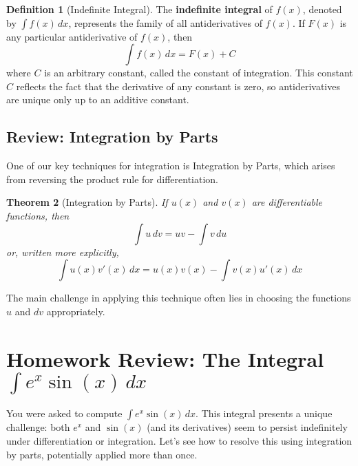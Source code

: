 \documentclass[11pt]{article}
\newtheorem{theorem}{Theorem}[section]
\theoremstyle{definition}
\newtheorem{definition}[theorem]{Definition}
\theoremstyle{remark}
\begin{document}
\begin{definition}[Indefinite Integral]
The \textbf{indefinite integral} of $f(x)$, denoted by $\int f(x) \, dx$, represents the family of all antiderivatives of $f(x)$. If $F(x)$ is any particular antiderivative of $f(x)$, then
\[ \int f(x) \, dx = F(x) + C \]
where $C$ is an arbitrary constant, called the constant of integration. This constant $C$ reflects the fact that the derivative of any constant is zero, so antiderivatives are unique only up to an additive constant.
\end{definition}

\subsection{Review: Integration by Parts}
One of our key techniques for integration is Integration by Parts, which arises from reversing the product rule for differentiation.

\begin{theorem}[Integration by Parts]
If $u(x)$ and $v(x)$ are differentiable functions, then
\[ \int u \, dv = uv - \int v \, du \]
or, written more explicitly,
\[ \int u(x) v'(x) \, dx = u(x) v(x) - \int v(x) u'(x) \, dx \]
\end{theorem}

The main challenge in applying this technique often lies in choosing the functions $u$ and $dv$ appropriately.

\section{Homework Review: The Integral \texorpdfstring{$\int e^x \sin(x) \, dx$}{Integral of e\^{}x sin(x) dx}}

You were asked to compute $\int e^x \sin(x) \, dx$. This integral presents a unique challenge: both $e^x$ and $\sin(x)$ (and its derivatives) seem to persist indefinitely under differentiation or integration. Let's see how to resolve this using integration by parts, potentially applied more than once.
\end{document}
